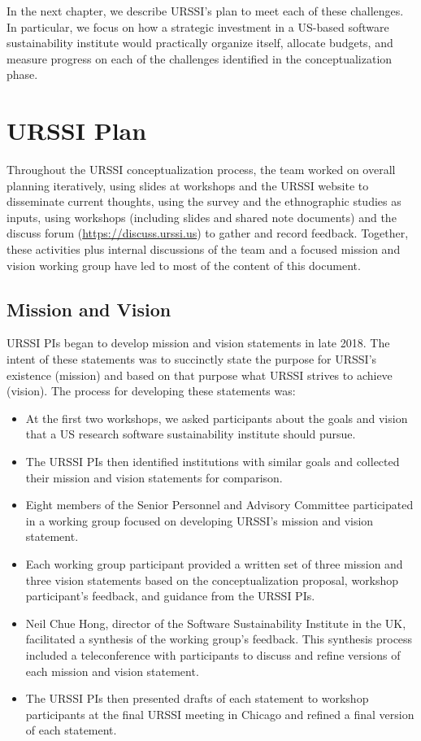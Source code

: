 \documentclass[
]{book}
\begin{document}
In the next chapter, we describe URSSI's plan to meet each of these challenges.
In particular, we focus on how a strategic investment in a US-based software
sustainability institute would practically organize itself, allocate budgets,
and measure progress on each of the challenges identified in the conceptualization phase.

\hypertarget{chapter3}{%
\chapter{URSSI Plan}\label{chapter3}}

Throughout the URSSI conceptualization process, the team worked on overall
planning iteratively, using slides at workshops and the URSSI website to
disseminate current thoughts, using the survey and the ethnographic studies as
inputs, using workshops (including slides and shared note documents) and the
discuss forum (\url{https://discuss.urssi.us}) to gather and record feedback. Together,
these activities plus internal discussions of the team and a focused mission and
vision working group have led to most of the content of this document.

\hypertarget{mission-and-vision}{%
\section{Mission and Vision}\label{mission-and-vision}}

URSSI PIs began to develop mission and vision statements in late 2018. The intent
of these statements was to succinctly state the purpose for URSSI's existence
(mission) and based on that purpose what URSSI strives to achieve (vision). The
process for developing these statements was:

\begin{itemize}
\item
  At the first two workshops, we asked participants about the goals and vision
  that a US research software sustainability institute should pursue.
\item
  The URSSI PIs then identified institutions with similar goals and collected
  their mission and vision statements for comparison.
\item
  Eight members of the Senior Personnel and Advisory Committee participated in
  a working group focused on developing URSSI's mission and vision statement.
\item
  Each working group participant provided a written set of three mission and
  three vision statements based on the conceptualization proposal, workshop
  participant's feedback, and guidance from the URSSI PIs.
\item
  Neil Chue Hong, director of the Software Sustainability Institute in the UK,
  facilitated a synthesis of the working group's feedback. This synthesis process included a
  teleconference with participants to discuss and refine versions of each
  mission and vision statement.
\item
  The URSSI PIs then presented drafts of each statement to workshop participants
  at the final URSSI meeting in Chicago and refined a final version of each statement.
\end{itemize}
\end{document}
